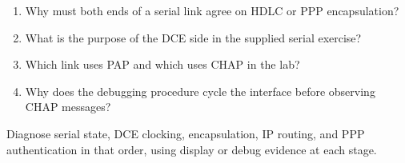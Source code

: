 \begin{quickcheck}
\begin{enumerate}
\item Why must both ends of a serial link agree on HDLC or PPP encapsulation?
\item What is the purpose of the DCE side in the supplied serial exercise?
\item Which link uses PAP and which uses CHAP in the lab?
\item Why does the debugging procedure cycle the interface before observing CHAP messages?
\end{enumerate}
\end{quickcheck}

\begin{chapterrecap}
Diagnose serial state, DCE clocking, encapsulation, IP routing, and PPP authentication in that order, using display or debug evidence at each stage.
\end{chapterrecap}


